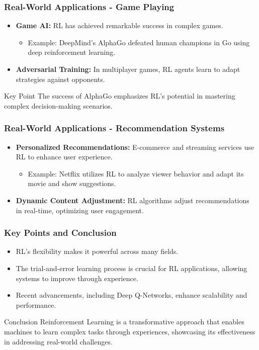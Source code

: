 \documentclass[aspectratio=169]{beamer}
\begin{document}
\begin{frame}[fragile]
  \frametitle{Real-World Applications - Game Playing}
  \begin{itemize}
    \item \textbf{Game AI:} RL has achieved remarkable success in complex games.
    \begin{itemize}
      \item Example: DeepMind's AlphaGo defeated human champions in Go using deep reinforcement learning.
    \end{itemize}
    \item \textbf{Adversarial Training:} In multiplayer games, RL agents learn to adapt strategies against opponents.
  \end{itemize}
  \begin{block}{Key Point}
    The success of AlphaGo emphasizes RL's potential in mastering complex decision-making scenarios.
  \end{block}
\end{frame}

\begin{frame}[fragile]
  \frametitle{Real-World Applications - Recommendation Systems}
  \begin{itemize}
    \item \textbf{Personalized Recommendations:} E-commerce and streaming services use RL to enhance user experience.
    \begin{itemize}
      \item Example: Netflix utilizes RL to analyze viewer behavior and adapt its movie and show suggestions.
    \end{itemize}
    \item \textbf{Dynamic Content Adjustment:} RL algorithms adjust recommendations in real-time, optimizing user engagement.
  \end{itemize}
\end{frame}

\begin{frame}[fragile]
  \frametitle{Key Points and Conclusion}
  \begin{itemize}
    \item RL's flexibility makes it powerful across many fields.
    \item The trial-and-error learning process is crucial for RL applications, allowing systems to improve through experience.
    \item Recent advancements, including Deep Q-Networks, enhance scalability and performance.
  \end{itemize}
  \begin{block}{Conclusion}
    Reinforcement Learning is a transformative approach that enables machines to learn complex tasks through experiences, showcasing its effectiveness in addressing real-world challenges.
  \end{block}
\end{frame}
\end{document}
